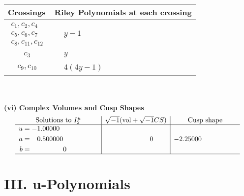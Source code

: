 \documentclass[1p]{elsarticle_modified}
\theoremstyle{definition}
\newcommand{\I}{\sqrt{-1}}
\begin{document}
\begin{tabular}{m{50pt}|m{274pt}}
Crossings & \hspace{64pt}Riley Polynomials at each crossing \\
\hline $$\begin{aligned}c_{1},c_{2},c_{4}\\c_{5},c_{6},c_{7}\\c_{8},c_{11},c_{12}\end{aligned}$$&$\begin{aligned}
&y-1
\end{aligned}$\\
\hline $$\begin{aligned}c_{3}\end{aligned}$$&$\begin{aligned}
&y
\end{aligned}$\\
\hline $$\begin{aligned}c_{9},c_{10}\end{aligned}$$&$\begin{aligned}
&4(4 y-1)
\end{aligned}$\\
\hline
\end{tabular}\\~\\
\newpage\flushleft \textbf{(vi) Complex Volumes and Cusp Shapes}
$$\begin{array}{c|c|c}  
\text{Solutions to }I^u_{2}& \I (\text{vol} + \sqrt{-1}CS) & \text{Cusp shape}\\
 \hline 
\begin{aligned}
u &= -1.00000\phantom{ +0.000000I} \\
a &= \phantom{-}0.500000\phantom{ +0.000000I} \\
b &= \phantom{-0.000000 } 0\end{aligned}
 & \phantom{-0.000000 } 0 & -2.25000\phantom{ +0.000000I}\\
 \hline 
 \end{array}$$\newpage
\newpage\renewcommand{\arraystretch}{1}
\centering \section*{ III. u-Polynomials}
\end{document}
